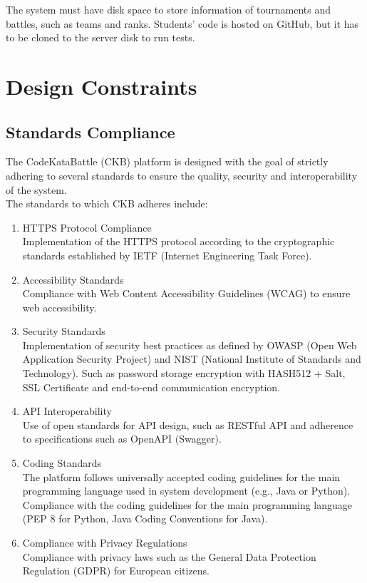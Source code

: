 The system must have disk space to store information of tournaments and battles, such as teams and ranks.
Students' code is hosted on GitHub, but it has to be cloned to the server disk to run tests.

\section{Design Constraints}
\subsection{Standards Compliance}
The CodeKataBattle (CKB) platform is designed with the goal of strictly adhering to several standards to ensure the quality, security and interoperability of the system.\\ The standards to which CKB adheres include:

\begin{enumerate}
      \item HTTPS Protocol Compliance\\
            Implementation of the HTTPS protocol according to the cryptographic standards established by IETF (Internet Engineering Task Force).

      \item Accessibility Standards\\
            Compliance with Web Content Accessibility Guidelines (WCAG) to ensure web accessibility.

      \item Security Standards\\
            Implementation of security best practices as defined by OWASP (Open Web Application Security Project) and NIST (National Institute of Standards and Technology).
            Such as password storage encryption with HASH512 + Salt, SSL Certificate and end-to-end communication encryption.


      \item API Interoperability\\
            Use of open standards for API design, such as RESTful API and adherence to specifications such as OpenAPI (Swagger).


      \item Coding Standards\\
            The platform follows universally accepted coding guidelines for the main programming language used in system development (e.g., Java or Python).
            Compliance with the coding guidelines for the main programming language (PEP 8 for Python, Java Coding Conventions for Java).


      \item Compliance with Privacy Regulations\\
            Compliance with privacy laws such as the General Data Protection Regulation (GDPR) for European citizens.
\end{enumerate}

